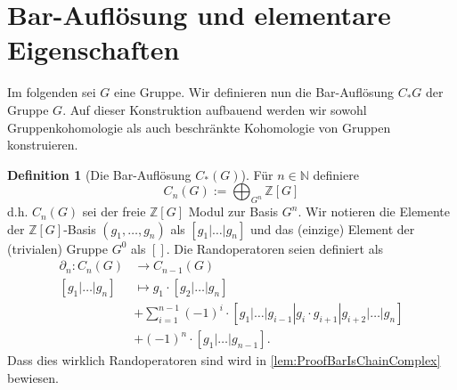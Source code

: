 \documentclass[a4paper,twoside,10pt]{scrreprt}
\newcommand{\Z}{\mathbb{Z}}
\newcommand{\N}{\mathbb{N}}
\theoremstyle{definition}
\newtheorem{definition}[satz]{Definition}
\begin{document}
\section{Bar-Auflösung und elementare Eigenschaften}
Im folgenden sei $G$ eine Gruppe.
Wir definieren nun die Bar-Auflösung $C_*{G}$ der Gruppe $G$. Auf dieser Konstruktion aufbauend werden wir sowohl Gruppenkohomologie als auch beschränkte Kohomologie von Gruppen konstruieren.
\begin{definition}[Die Bar-Auflösung $C_*(G)$]\label{def:BarRes}
Für $n\in \N$ definiere
\begin{equation*}
C_n(G):=\bigoplus_{G^n} \Z[G]
\end{equation*}
d.h. $C_n(G)$ sei der freie $\Z[G]$ Modul zur Basis $G^n$. Wir notieren die Elemente der $\Z[G]$-Basis $(g_1,\ldots,g_n)$ als $[g_1|\ldots|g_n]$ und das (einzige) Element der (trivialen) Gruppe $G^0$ als $[]$.
Die Randoperatoren seien definiert als
\begin{align*}
\partial_n:C_n(G)&\to C_{n-1}(G)\\
[g_1|\ldots|g_n]&\mapsto g_1\cdot [g_2|\ldots|g_n]\\ 
&+\sum\limits_{i=1}^{n-1} (-1)^i\cdot [g_1|\ldots|g_{i-1}|g_i\cdot g_{i+1}|g_{i+2}|\ldots|g_n]\\
&+(-1)^n\cdot [g_1|\ldots|g_{n-1}].
\end{align*}
Dass dies wirklich Randoperatoren sind wird in \cref{lem:ProofBarIsChainComplex} bewiesen.
\end{definition}
\end{document}

